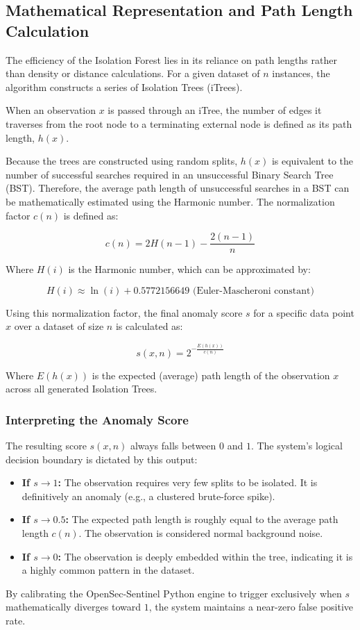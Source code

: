 \documentclass[12pt, a4paper]{report}
\begin{document}
	\subsection{Mathematical Representation and Path Length Calculation}
	The efficiency of the Isolation Forest lies in its reliance on path lengths rather than density or distance calculations. For a given dataset of $n$ instances, the algorithm constructs a series of Isolation Trees (iTrees). 
	
	When an observation $x$ is passed through an iTree, the number of edges it traverses from the root node to a terminating external node is defined as its path length, $h(x)$.
	
	Because the trees are constructed using random splits, $h(x)$ is equivalent to the number of successful searches required in an unsuccessful Binary Search Tree (BST). Therefore, the average path length of unsuccessful searches in a BST can be mathematically estimated using the Harmonic number. The normalization factor $c(n)$ is defined as:
	
	\[
	c(n) = 2H(n - 1) - \frac{2(n - 1)}{n}
	\]
	
	Where $H(i)$ is the Harmonic number, which can be approximated by:
	
	\[
	H(i) \approx \ln(i) + 0.5772156649 \text{ (Euler-Mascheroni constant)}
	\]
	
	Using this normalization factor, the final anomaly score $s$ for a specific data point $x$ over a dataset of size $n$ is calculated as:
	
	\[
	s(x,n) = 2^{-\frac{E(h(x))}{c(n)}}
	\]
	
	Where $E(h(x))$ is the expected (average) path length of the observation $x$ across all generated Isolation Trees.
	
	\subsubsection{Interpreting the Anomaly Score}
	The resulting score $s(x,n)$ always falls between $0$ and $1$. The system's logical decision boundary is dictated by this output:
	\begin{itemize}
		\item \textbf{If $s \rightarrow 1$:} The observation requires very few splits to be isolated. It is definitively an anomaly (e.g., a clustered brute-force spike).
		\item \textbf{If $s \rightarrow 0.5$:} The expected path length is roughly equal to the average path length $c(n)$. The observation is considered normal background noise.
		\item \textbf{If $s \rightarrow 0$:} The observation is deeply embedded within the tree, indicating it is a highly common pattern in the dataset.
	\end{itemize}
	By calibrating the OpenSec-Sentinel Python engine to trigger exclusively when $s$ mathematically diverges toward $1$, the system maintains a near-zero false positive rate.
	
\end{document}
